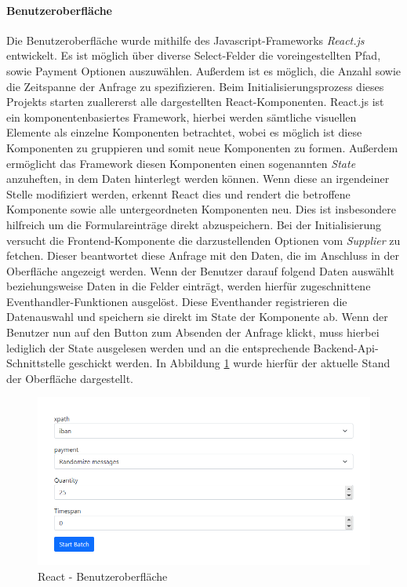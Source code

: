 \paragraph{Benutzeroberfläche}
Die Benutzeroberfläche wurde mithilfe des Javascript-Frameworks \emph{React.js} entwickelt. Es ist möglich über diverse Select-Felder die voreingestellten Pfad, sowie Payment Optionen auszuwählen. Außerdem ist es möglich, die Anzahl sowie die Zeitspanne der Anfrage zu spezifizieren. Beim Initialisierungsprozess dieses Projekts starten zuallererst alle dargestellten React-Komponenten. React.js ist ein komponentenbasiertes Framework, hierbei werden sämtliche visuellen Elemente als einzelne Komponenten betrachtet, wobei es möglich ist diese Komponenten zu gruppieren und somit neue Komponenten zu formen. Außerdem ermöglicht das Framework diesen Komponenten einen sogenannten \emph{State} anzuheften, in dem Daten hinterlegt werden können. Wenn diese an irgendeiner Stelle modifiziert werden, erkennt React dies und rendert die betroffene Komponente sowie alle untergeordneten Komponenten neu. Dies ist insbesondere hilfreich um die Formulareinträge direkt abzuspeichern. Bei der Initialisierung versucht die Frontend-Komponente die darzustellenden Optionen vom \emph{Supplier} zu fetchen. Dieser beantwortet diese Anfrage mit den Daten, die im Anschluss in der Oberfläche angezeigt werden. Wenn der Benutzer darauf folgend Daten auswählt beziehungsweise Daten in die Felder einträgt, werden hierfür zugeschnittene Eventhandler-Funktionen ausgelöst. Diese Eventhander registrieren die Datenauswahl und speichern sie direkt im State der Komponente ab. Wenn der Benutzer nun auf den Button zum Absenden der Anfrage klickt, muss hierbei lediglich der State ausgelesen werden und an die entsprechende Backend-Api-Schnittstelle geschickt werden. In Abbildung \ref{fig:reactUi} wurde hierfür der aktuelle Stand der Oberfläche dargestellt.

\begin{figure}[ht!]
	\centering
	\includegraphics[width=.9\linewidth]{kapitel/problemloesung/implementierung/_img/react01}
	\caption[React - Benutzeroberfläche]{React - Benutzeroberfläche}
	\label{fig:reactUi}
\end{figure}

